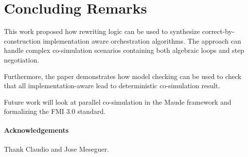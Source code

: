 \section{Concluding Remarks}\label{sc:summary}
This work proposed how rewriting logic can be used to synthesize correct-by-construction implementation aware orchestration algorithms.
The approach can handle complex co-simulation scenarios containing both algebraic loops and step negotiation.

Furthermore, the paper demonstrates how model checking can be used to check that all implementation-aware lead to deterministic co-simulation result.


Future work will look at parallel co-simulation in the Maude framework and formalizing the FMI 3.0 standard. 

\paragraph{Acknowledgements}
Thank Claudio and Jose Meseguer.
